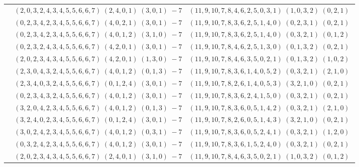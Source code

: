 \documentclass[11pt]{article}
\begin{document}
\begin{longtable}[l]{|c|c|c|}
 \cline{2-3} 
 & $(2 ,0 ,3 ,2 ,4 ,3 ,4 ,5 ,5 ,6 ,6 ,7) \;(2 ,4 ,0 ,1) \;(3 ,0 ,1) \;-7$ & $(11 ,9 ,10 ,7 ,8 ,4 ,6 ,2 ,5 ,0 ,3 ,1) \;(1 ,0 ,3 ,2) \;(0 ,2 ,1) \;$\\ 
 \cline{2-3} 
 & $(0 ,2 ,3 ,4 ,2 ,3 ,4 ,5 ,5 ,6 ,6 ,7) \;(4 ,0 ,2 ,1) \;(3 ,0 ,1) \;-7$ & $(11 ,9 ,10 ,7 ,8 ,3 ,6 ,2 ,5 ,1 ,4 ,0) \;(0 ,2 ,3 ,1) \;(0 ,2 ,1) \;$\\ 
 \cline{2-3} 
 & $(0 ,2 ,3 ,4 ,2 ,3 ,4 ,5 ,5 ,6 ,6 ,7) \;(4 ,0 ,1 ,2) \;(3 ,1 ,0) \;-7$ & $(11 ,9 ,10 ,7 ,8 ,3 ,6 ,2 ,5 ,1 ,4 ,0) \;(0 ,3 ,2 ,1) \;(0 ,1 ,2) \;$\\ 
 \cline{2-3} 
 & $(0 ,2 ,3 ,2 ,4 ,3 ,4 ,5 ,5 ,6 ,6 ,7) \;(4 ,2 ,0 ,1) \;(3 ,0 ,1) \;-7$ & $(11 ,9 ,10 ,7 ,8 ,4 ,6 ,2 ,5 ,1 ,3 ,0) \;(0 ,1 ,3 ,2) \;(0 ,2 ,1) \;$\\ 
 \cline{2-3} 
 & $(2 ,0 ,2 ,3 ,4 ,3 ,4 ,5 ,5 ,6 ,6 ,7) \;(4 ,2 ,0 ,1) \;(1 ,3 ,0) \;-7$ & $(11 ,9 ,10 ,7 ,8 ,4 ,6 ,3 ,5 ,0 ,2 ,1) \;(0 ,1 ,3 ,2) \;(1 ,0 ,2) \;$\\ 
 \cline{2-3} 
 & $(2 ,3 ,0 ,4 ,3 ,2 ,4 ,5 ,5 ,6 ,6 ,7) \;(4 ,0 ,1 ,2) \;(0 ,1 ,3) \;-7$ & $(11 ,9 ,10 ,7 ,8 ,3 ,6 ,1 ,4 ,0 ,5 ,2) \;(0 ,3 ,2 ,1) \;(2 ,1 ,0) \;$\\ 
 \cline{2-3} 
 & $(2 ,3 ,4 ,0 ,3 ,2 ,4 ,5 ,5 ,6 ,6 ,7) \;(0 ,1 ,2 ,4) \;(3 ,0 ,1) \;-7$ & $(11 ,9 ,10 ,7 ,8 ,2 ,6 ,1 ,4 ,0 ,5 ,3) \;(3 ,2 ,1 ,0) \;(0 ,2 ,1) \;$\\ 
 \cline{2-3} 
 & $(0 ,2 ,3 ,4 ,3 ,2 ,4 ,5 ,5 ,6 ,6 ,7) \;(4 ,0 ,1 ,2) \;(3 ,0 ,1) \;-7$ & $(11 ,9 ,10 ,7 ,8 ,3 ,6 ,2 ,4 ,1 ,5 ,0) \;(0 ,3 ,2 ,1) \;(0 ,2 ,1) \;$\\ 
 \cline{2-3} 
 & $(3 ,2 ,0 ,4 ,2 ,3 ,4 ,5 ,5 ,6 ,6 ,7) \;(4 ,0 ,1 ,2) \;(0 ,1 ,3) \;-7$ & $(11 ,9 ,10 ,7 ,8 ,3 ,6 ,0 ,5 ,1 ,4 ,2) \;(0 ,3 ,2 ,1) \;(2 ,1 ,0) \;$\\ 
 \cline{2-3} 
 & $(3 ,2 ,4 ,0 ,2 ,3 ,4 ,5 ,5 ,6 ,6 ,7) \;(0 ,1 ,2 ,4) \;(3 ,0 ,1) \;-7$ & $(11 ,9 ,10 ,7 ,8 ,2 ,6 ,0 ,5 ,1 ,4 ,3) \;(3 ,2 ,1 ,0) \;(0 ,2 ,1) \;$\\ 
 \cline{2-3} 
 & $(3 ,0 ,2 ,4 ,2 ,3 ,4 ,5 ,5 ,6 ,6 ,7) \;(4 ,0 ,1 ,2) \;(0 ,3 ,1) \;-7$ & $(11 ,9 ,10 ,7 ,8 ,3 ,6 ,0 ,5 ,2 ,4 ,1) \;(0 ,3 ,2 ,1) \;(1 ,2 ,0) \;$\\ 
 \cline{2-3} 
 & $(0 ,3 ,2 ,4 ,2 ,3 ,4 ,5 ,5 ,6 ,6 ,7) \;(4 ,0 ,1 ,2) \;(3 ,0 ,1) \;-7$ & $(11 ,9 ,10 ,7 ,8 ,3 ,6 ,1 ,5 ,2 ,4 ,0) \;(0 ,3 ,2 ,1) \;(0 ,2 ,1) \;$\\ 
 \cline{2-3} 
 & $(2 ,0 ,2 ,3 ,4 ,3 ,4 ,5 ,5 ,6 ,6 ,7) \;(2 ,4 ,0 ,1) \;(3 ,1 ,0) \;-7$ & $(11 ,9 ,10 ,7 ,8 ,4 ,6 ,3 ,5 ,0 ,2 ,1) \;(1 ,0 ,3 ,2) \;(0 ,1 ,2) \;$\\ 

\end{longtable}
\end{document}
